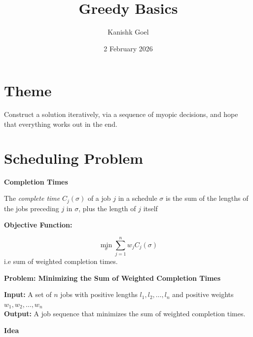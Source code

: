 \documentclass{article}
\title{Greedy Basics}
\author{Kanishk Goel}
\date{2 February 2026}
\begin{document}
	\maketitle
	\section{Theme}
	Construct a solution iteratively, via a sequence of myopic decisions, and hope that everything works out in the end.
	\section{Scheduling Problem}
	\begin{center}
		\begin{large}
			\textbf{Completion Times} \\
		\end{large}
	\end{center} The \textit{complete time} $C_j(\sigma)$ of a job $j$ in a schedule $\sigma$ is the sum of the lengths of the jobs preceding $j$ in $\sigma$, plus the length of $j$ itself 
	
	\begin{center}
		\begin{large}
			\textbf{Objective Function:} \\
		\end{large}
	\end{center}
	\[\min\limits_{\sigma} \sum_{j=1}^{n} w_j C_j(\sigma)\]
	i.e  sum of weighted completion times. \\
	
	\begin{center}
		\begin{large}
			\textbf{Problem: Minimizing the Sum of Weighted Completion Times} \\
		\end{large}
	\end{center}
	
	\textbf{Input:}  A set of $n$ jobs with positive lengths $l_1,l_2,\ldots,l_n$ and positive weights $w_1,w_2,\ldots,w_n$ \\
	
	\textbf{Output:} A job sequence that minimizes the sum of weighted completion times. \\
	
	\begin{center}
		\begin{large}
			\textbf{Idea} \\
		\end{large}
	\end{center}
	
\end{document}
